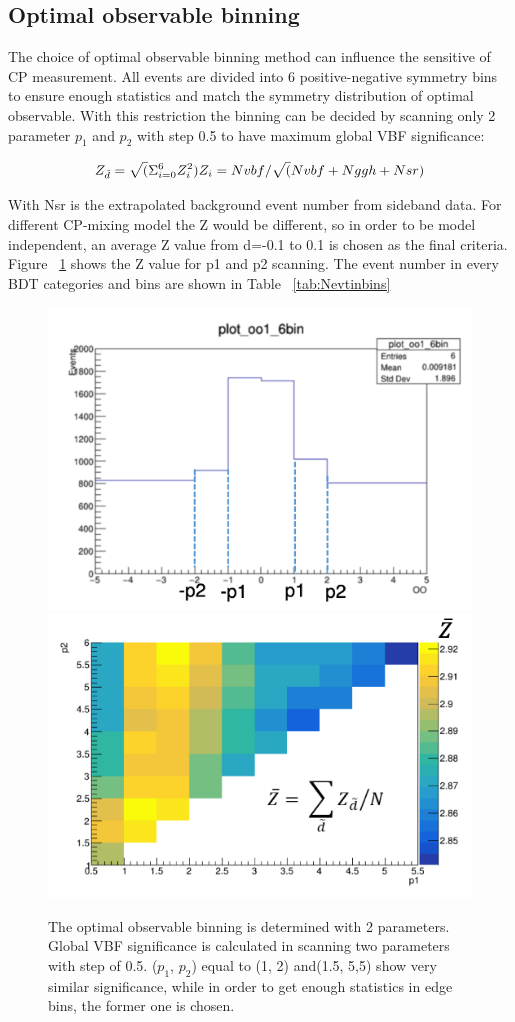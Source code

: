 \subsection{Optimal observable binning}

The choice of optimal observable binning method can influence the sensitive of CP measurement. All events are divided into 6 positive-negative symmetry bins to ensure enough statistics and match the symmetry distribution of optimal observable. With this restriction the binning can be decided by scanning only 2 parameter $p_1$ and $p_2$ with step 0.5 to have maximum global VBF significance:

$$
 Z_{\tilde{d}} = \sqrt(\Sigma_{i=0}^{6} Z_{i}^{2}) \\
 Z_{i} = Nvbf/\sqrt(Nvbf+Nggh+Nsr)
$$

With Nsr is the extrapolated background event number from sideband data. For different CP-mixing model the Z would be different, so in order to be model independent, an average Z value from d=-0.1 to 0.1 is chosen as the final criteria. Figure ~\ref{fig:Zvsp} shows the Z value for p1 and p2 scanning. The event number in every BDT categories and bins are shown in Table ~\ref{tab:Nevtinbins}

\begin{figure}[tbp]
  \centering
  \includegraphics[width=0.45\linewidth]{figure/OObinning/binning.png}
  \includegraphics[width=0.45\linewidth]{figure/OObinning/Zscanning.png}
  \caption{The optimal observable binning is determined with 2 parameters. Global VBF significance is calculated in scanning two parameters with step of 0.5. ($p_1$, $p_2$) equal to (1, 2) and(1.5, 5,5) show very similar significance, while in order to get enough statistics in edge bins, the former one is chosen.}
  \label{fig:Zvsp}
\end{figure}

